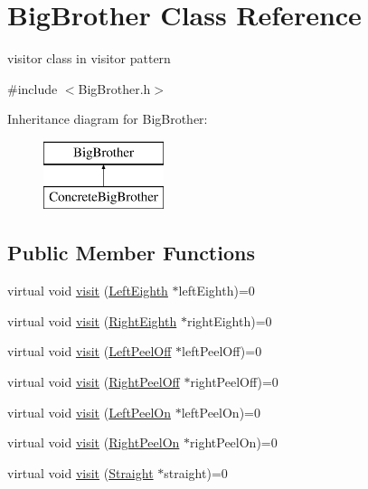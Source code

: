 \hypertarget{class_big_brother}{}\section{Big\+Brother Class Reference}
\label{class_big_brother}


visitor class in visitor pattern  




{\ttfamily \#include $<$Big\+Brother.\+h$>$}

Inheritance diagram for Big\+Brother\+:\begin{figure}[H]
\begin{center}
\leavevmode
\includegraphics[height=2.000000cm]{class_big_brother}
\end{center}
\end{figure}
\subsection*{Public Member Functions}
\begin{DoxyCompactItemize}
\item 
virtual void \mbox{\hyperlink{class_big_brother_a2fabe9f19796ca5b9882ed3d8c8901d0}{visit}} (\mbox{\hyperlink{class_left_eighth}{Left\+Eighth}} $\ast$left\+Eighth)=0
\item 
virtual void \mbox{\hyperlink{class_big_brother_a99a50a1db4244d77dd3dcaa9fdbd7946}{visit}} (\mbox{\hyperlink{class_right_eighth}{Right\+Eighth}} $\ast$right\+Eighth)=0
\item 
virtual void \mbox{\hyperlink{class_big_brother_abcc93629cd4baa43ed2c729dcc97f080}{visit}} (\mbox{\hyperlink{class_left_peel_off}{Left\+Peel\+Off}} $\ast$left\+Peel\+Off)=0
\item 
virtual void \mbox{\hyperlink{class_big_brother_a2da409f26a8ecda1b6d63ed295dc732d}{visit}} (\mbox{\hyperlink{class_right_peel_off}{Right\+Peel\+Off}} $\ast$right\+Peel\+Off)=0
\item 
virtual void \mbox{\hyperlink{class_big_brother_a22ee539312b1b56ef51e3a22a05f70d5}{visit}} (\mbox{\hyperlink{class_left_peel_on}{Left\+Peel\+On}} $\ast$left\+Peel\+On)=0
\item 
virtual void \mbox{\hyperlink{class_big_brother_a4fbe48dafe53fe16647e0c4627ef178c}{visit}} (\mbox{\hyperlink{class_right_peel_on}{Right\+Peel\+On}} $\ast$right\+Peel\+On)=0
\item 
virtual void \mbox{\hyperlink{class_big_brother_a16c919a7c2d90a111eb122210923bff2}{visit}} (\mbox{\hyperlink{class_straight}{Straight}} $\ast$straight)=0
\end{DoxyCompactItemize}


